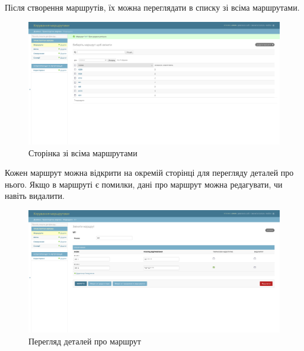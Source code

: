 Після створення маршрутів, їх можна переглядати в списку зі всіма маршрутами.

\begin{figure}[!h]
	\centering
	\includegraphics[scale=0.35]{content/chapters/4-results/assets/img/admin_view_r.png}
	\caption{Сторінка зі всіма маршрутами}
	\label{fig:route_display_page}
\end{figure}



Кожен маршрут можна відкрити на окремій сторінці для перегляду деталей  про нього. Якщо в маршруті є помилки, дані про маршрут можна редагувати, чи навіть видалити.

\begin{figure}[!h]
	\centering
	\includegraphics[scale=0.35]{content/chapters/4-results/assets/img/admin_r_details.png}
	\caption{Перегляд деталей про маршрут}
	\label{fig:route_edit_page}
\end{figure}

